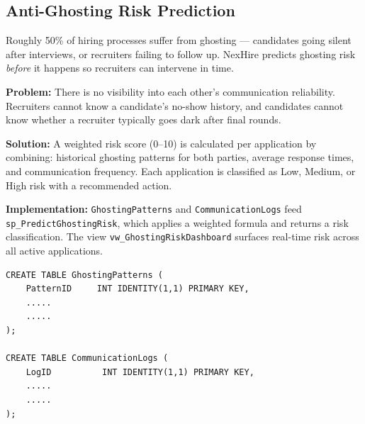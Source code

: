 \documentclass[11pt,a4paper]{article}
\begin{document}
\subsection{Anti-Ghosting Risk Prediction}
\noindent
Roughly 50\% of hiring processes suffer from ghosting --- candidates going silent after interviews, or recruiters failing to follow up. NexHire predicts ghosting risk \textit{before} it happens so recruiters can intervene in time.

\textbf{Problem:} There is no visibility into each other's communication reliability. Recruiters cannot know a candidate's no-show history, and candidates cannot know whether a recruiter typically goes dark after final rounds.

\textbf{Solution:} A weighted risk score (0--10) is calculated per application by combining: historical ghosting patterns for both parties, average response times, and communication frequency. Each application is classified as Low, Medium, or High risk with a recommended action.

\textbf{Implementation:} \texttt{GhostingPatterns} and \texttt{CommunicationLogs} feed \texttt{sp\_PredictGhostingRisk}, which applies a weighted formula and returns a risk classification. The view \texttt{vw\_GhostingRiskDashboard} surfaces real-time risk across all active applications.

\begin{verbatim}
CREATE TABLE GhostingPatterns (
    PatternID     INT IDENTITY(1,1) PRIMARY KEY,
    .....
    .....
);

CREATE TABLE CommunicationLogs (
    LogID          INT IDENTITY(1,1) PRIMARY KEY,
    .....
    .....
);
\end{verbatim}
\end{document}
